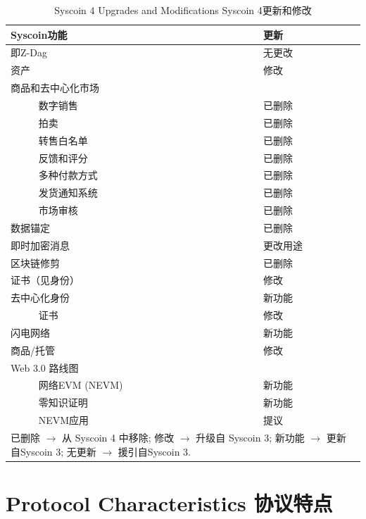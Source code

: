 \documentclass{ctexart}
\begin{document}
\begin{table}[h!]
\caption{Syscoin 4 Upgrades and Modifications Syscoin 4更新和修改}
\label{table:ugrades}
\setlength{\tabcolsep}{3pt}
\begin{tabular}{|p{135pt}|p{75pt}|}
\hline
Syscoin功能 & 更新\\

\hline
即Z-Dag & 无更改\\
资产 &  修改\\

商品和去中心化市场 &   \\
~~~~~ 数字销售 &  已删除 \\
~~~~~ 拍卖 &  已删除 \\
~~~~~ 转售白名单 &  已删除 \\
~~~~~ 反馈和评分  &  已删除 \\
~~~~~ 多种付款方式 &  已删除 \\
~~~~~ 发货通知系统 &  已删除 \\
~~~~~ 市场审核 &  已删除 \\

数据锚定  &  已删除 \\
即时加密消息 &  更改用途 \\
区块链修剪 &  已删除 \\
证书（见身份） &  修改 \\
去中心化身份 &  新功能 \\
~~~~~ 证书 &  修改 \\
闪电网络 &  新功能 \\
商品/托管 &  修改 \\
Web 3.0 路线图  & \\
~~~~~ 网络EVM (NEVM)  &  新功能  \\
~~~~~ 零知识证明 &  新功能 \\
~~~~~ NEVM应用 &  提议 \\

\hline
\multicolumn{2}{p{251pt}}{已删除   $\rightarrow$ 从 Syscoin 4 中移除; 修改  $\rightarrow$ 升级自 Syscoin 3; 新功能  $\rightarrow$ 更新自Syscoin 3; 无更新 $\rightarrow$ 援引自Syscoin 3. }\\

\end{tabular}
\label{tab1}
\end{table}

\section{Protocol Characteristics 协议特点}
\label{sec:protocol}
\end{document}
